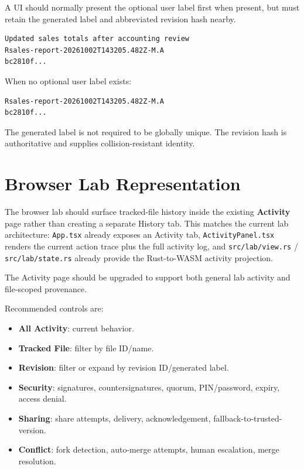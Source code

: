 \documentclass[11pt]{article}
\begin{document}
A UI should normally present the optional user label first when present, but must retain the generated label and abbreviated revision hash nearby.

\begin{lstlisting}
Updated sales totals after accounting review
Rsales-report-20261002T143205.482Z-M.A
bc2810f...
\end{lstlisting}

When no optional user label exists:

\begin{lstlisting}
Rsales-report-20261002T143205.482Z-M.A
bc2810f...
\end{lstlisting}

The generated label is not required to be globally unique. The revision hash is authoritative and supplies collision-resistant identity.

\section{Browser Lab Representation}

The browser lab should surface tracked-file history inside the existing \textbf{Activity} page rather than creating a separate History tab. This matches the current lab architecture: \texttt{App.tsx} already exposes an Activity tab, \texttt{ActivityPanel.tsx} renders the current action trace plus the full activity log, and \texttt{src/lab/view.rs} / \texttt{src/lab/state.rs} already provide the Rust-to-WASM activity projection.

The Activity page should be upgraded to support both general lab activity and file-scoped provenance.

Recommended controls are:

\begin{itemize}[leftmargin=1.5em]
  \item \textbf{All Activity}: current behavior.
  \item \textbf{Tracked File}: filter by file ID/name.
  \item \textbf{Revision}: filter or expand by revision ID/generated label.
  \item \textbf{Security}: signatures, countersignatures, quorum, PIN/password, expiry, access denial.
  \item \textbf{Sharing}: share attempts, delivery, acknowledgement, fallback-to-trusted-version.
  \item \textbf{Conflict}: fork detection, auto-merge attempts, human escalation, merge resolution.
\end{itemize}
\end{document}
